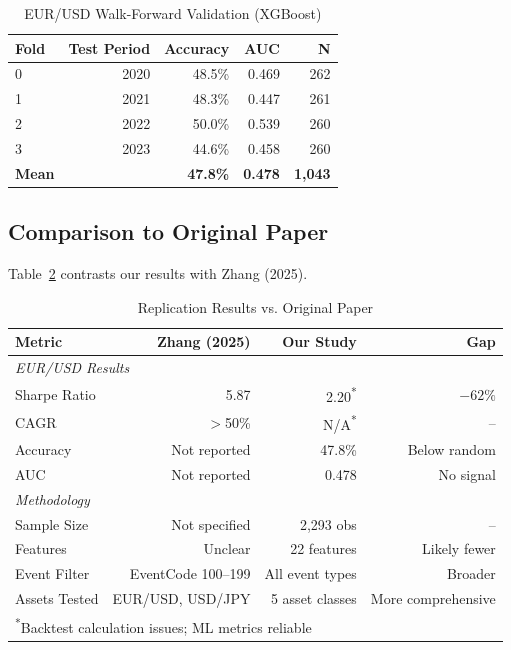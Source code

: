 \documentclass[11pt]{article}
\begin{document}
\begin{table}[h]
\centering
\caption{EUR/USD Walk-Forward Validation (XGBoost)}
\label{tab:eurusd}
\begin{tabular}{lrrrr}
\toprule
\textbf{Fold} & \textbf{Test Period} & \textbf{Accuracy} & \textbf{AUC} & \textbf{N} \\
\midrule
0 & 2020 & 48.5\% & 0.469 & 262 \\
1 & 2021 & 48.3\% & 0.447 & 261 \\
2 & 2022 & 50.0\% & 0.539 & 260 \\
3 & 2023 & 44.6\% & 0.458 & 260 \\
\midrule
\textbf{Mean} & & \textbf{47.8\%} & \textbf{0.478} & \textbf{1,043} \\
\bottomrule
\end{tabular}
\end{table}

\subsection{Comparison to Original Paper}

Table~\ref{tab:comparison} contrasts our results with Zhang (2025).

\begin{table}[h]
\centering
\caption{Replication Results vs. Original Paper}
\label{tab:comparison}
\begin{tabular}{lrrr}
\toprule
\textbf{Metric} & \textbf{Zhang (2025)} & \textbf{Our Study} & \textbf{Gap} \\
\midrule
\multicolumn{4}{l}{\textit{EUR/USD Results}} \\
Sharpe Ratio & 5.87 & 2.20\textsuperscript{*} & $-62\%$ \\
CAGR & $>$50\% & N/A\textsuperscript{*} & -- \\
Accuracy & Not reported & 47.8\% & Below random \\
AUC & Not reported & 0.478 & No signal \\
\midrule
\multicolumn{4}{l}{\textit{Methodology}} \\
Sample Size & Not specified & 2,293 obs & -- \\
Features & Unclear & 22 features & Likely fewer \\
Event Filter & EventCode 100--199 & All event types & Broader \\
Assets Tested & EUR/USD, USD/JPY & 5 asset classes & More comprehensive \\
\bottomrule
\multicolumn{4}{l}{\small \textsuperscript{*}Backtest calculation issues; ML metrics reliable}
\end{tabular}
\end{table}
\end{document}

